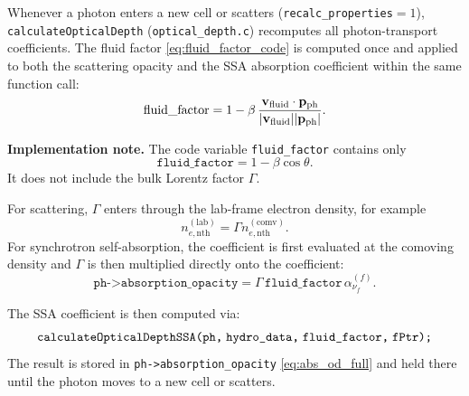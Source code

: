 \documentclass[12pt,a4paper]{article}
\newcommand{\code}[1]{\texttt{#1}}
\newenvironment{implementationnote}{%
	\begin{framed}\noindent\textbf{Implementation note.}\quad}
	{\end{framed}}
\begin{document}
Whenever a photon enters a new cell or scatters
(\code{recalc\_properties}$=1$), \code{calculateOpticalDepth}
(\code{optical\_depth.c}) recomputes all photon-transport coefficients.
The fluid factor \eqref{eq:fluid_factor_code} is computed once and
applied to both the scattering opacity and the SSA absorption coefficient
within the same function call:
\begin{equation}
	\mathrm{fluid\_factor}
	= 1 - \beta \,
	\frac{\mathbf{v}_{\rm fluid} \cdot \mathbf{p}_{\rm ph}}
	{|\mathbf{v}_{\rm fluid}||\mathbf{p}_{\rm ph}|}.
	\label{eq:fluid_factor_calc}
\end{equation}
\begin{implementationnote}
	The code variable \code{fluid\_factor} contains only
	\begin{equation}
		\code{fluid\_factor}
		=
		1-\beta\cos\theta.
	\end{equation}
	It does not include the bulk Lorentz factor \(\Gamma\).
	
	For scattering, \(\Gamma\) enters through the lab-frame electron density,
	for example
	\begin{equation}
		n_{e,\mathrm{nth}}^{(\mathrm{lab})}
		=
		\Gamma n_{e,\mathrm{nth}}^{(\mathrm{comv})}.
	\end{equation}
	For synchrotron self-absorption, the coefficient is first evaluated at
	the comoving density and \(\Gamma\) is then multiplied directly onto the
	coefficient:
	\begin{equation}
		\code{ph->absorption\_opacity}
		=
		\Gamma\,\code{fluid\_factor}\,
		\alpha_{\nu_f}^{(f)}.
	\end{equation}
\end{implementationnote}

The SSA coefficient is then computed via:
\begin{equation}
	\code{calculateOpticalDepthSSA(ph,\;hydro\_data,\;fluid\_factor,\;fPtr);}
\end{equation}
The result is stored in \code{ph->absorption\_opacity}
\eqref{eq:abs_od_full} and held there until the photon moves to a new
cell or scatters.  
\end{document}
